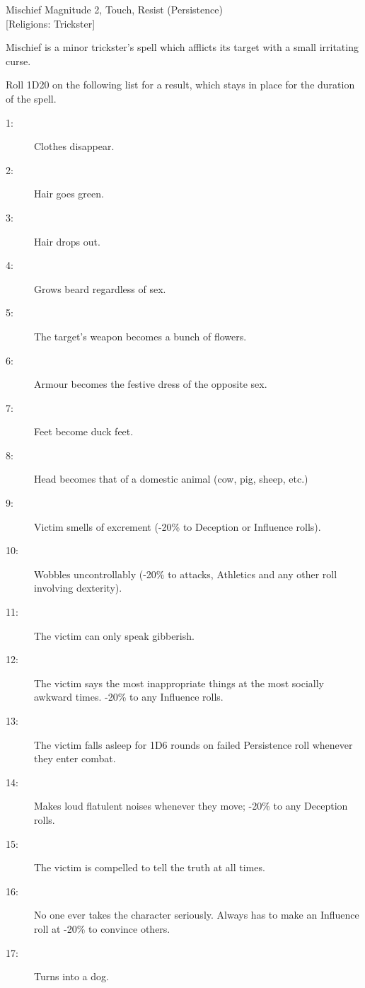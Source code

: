 \begin{rpg-spell}
{Mischief}
{Magnitude 2, Touch, Resist (Persistence)\\{[Religions: Trickster]}}

Mischief is a minor trickster’s spell which afflicts its target with a small irritating curse.

Roll 1D20 on the following list for a result, which stays in place for the duration of the spell.

\begin{description}
\item[1:] Clothes disappear.
\item[2:] Hair goes green.
\item[3:] Hair drops out.
\item[4:] Grows beard regardless of sex.
\item[5:] The target's weapon becomes a bunch of flowers.
\item[6:] Armour becomes the festive dress of the opposite sex.
\item[7:] Feet become duck feet.
\item[8:] Head becomes that of a domestic animal (cow, pig, sheep, etc.)
\item[9:] Victim smells of excrement (-20\% to Deception or Influence rolls).
\item[10:] Wobbles uncontrollably (-20\% to attacks, Athletics and any other roll involving dexterity).
\item[11:] The victim can only speak gibberish.
\item[12:] The victim says the most inappropriate things at the most socially awkward times. -20\% to any Influence rolls.
\item[13:] The victim falls asleep for 1D6 rounds on failed Persistence roll whenever they enter combat.
\item[14:] Makes loud flatulent noises whenever they move; -20\% to any Deception rolls.
\item[15:] The victim is compelled to tell the truth at all times.
\item[16:] No one ever takes the character seriously. Always has to make an Influence roll at -20\% to convince others.
\item[17:] Turns into a dog.
\end{description}
\end{rpg-spell}



